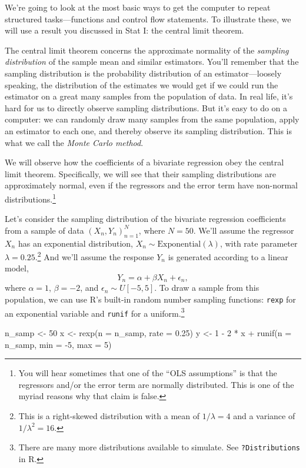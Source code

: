 \documentclass[
  12pt,
  oneside,openany]{book}
\newenvironment{Shaded}{\begin{snugshade}}{\end{snugshade}}
\newcommand{\AttributeTok}[1]{\textcolor[rgb]{0.77,0.63,0.00}{#1}}
\newcommand{\DecValTok}[1]{\textcolor[rgb]{0.00,0.00,0.81}{#1}}
\newcommand{\FloatTok}[1]{\textcolor[rgb]{0.00,0.00,0.81}{#1}}
\newcommand{\FunctionTok}[1]{\textcolor[rgb]{0.00,0.00,0.00}{#1}}
\newcommand{\NormalTok}[1]{#1}
\newcommand{\OtherTok}[1]{\textcolor[rgb]{0.56,0.35,0.01}{#1}}
\newcommand{\SpecialCharTok}[1]{\textcolor[rgb]{0.00,0.00,0.00}{#1}}
\begin{document}
We're going to look at the most basic ways to get the computer to repeat structured tasks---functions and control flow statements. To illustrate these, we will use a result you discussed in Stat I: the central limit theorem.

The central limit theorem concerns the approximate normality of the \emph{sampling distribution} of the sample mean and similar estimators.
You'll remember that the sampling distribution is the probability distribution of an estimator---loosely speaking, the distribution of the estimates we would get if we could run the estimator on a great many samples from the population of data.
In real life, it's hard for us to directly observe sampling distributions.
But it's easy to do on a computer: we can randomly draw many samples from the same population, apply an estimator to each one, and thereby observe its sampling distribution.
This is what we call the \emph{Monte Carlo method}.

We will observe how the coefficients of a bivariate regression obey the central limit theorem.
Specifically, we will see that their sampling distributions are approximately normal, even if the regressors and the error term have non-normal distributions.\footnote{You will hear sometimes that one of the ``OLS assumptions'' is that the regressors and/or the error term are normally distributed. This is one of the myriad reasons why that claim is false.}

Let's consider the sampling distribution of the bivariate regression coefficients from a sample of data \((X_n, Y_n)_{n=1}^N\), where \(N = 50\).
We'll assume the regressor \(X_n\) has an exponential distribution, \(X_n \sim \text{Exponential}(\lambda)\), with rate parameter \(\lambda = 0.25\).\footnote{This is a right-skewed distribution with a mean of \(1 / \lambda = 4\) and a variance of \(1 / \lambda^2 = 16\).}
And we'll assume the response \(Y_n\) is generated according to a linear model, \[Y_n = \alpha + \beta X_n + \epsilon_n,\] where \(\alpha = 1\), \(\beta = -2\), and \(\epsilon_n \sim U[-5, 5]\).
To draw a sample from this population, we can use R's built-in random number sampling functions: \texttt{rexp} for an exponential variable and \texttt{runif} for a uniform.\footnote{There are many more distributions available to simulate. See \texttt{?Distributions} in R.}

\begin{Shaded}
\begin{Highlighting}[]
\NormalTok{n\_samp }\OtherTok{\textless{}{-}} \DecValTok{50}
\NormalTok{x }\OtherTok{\textless{}{-}} \FunctionTok{rexp}\NormalTok{(}\AttributeTok{n =}\NormalTok{ n\_samp, }\AttributeTok{rate =} \FloatTok{0.25}\NormalTok{)}
\NormalTok{y }\OtherTok{\textless{}{-}} \DecValTok{1} \SpecialCharTok{{-}} \DecValTok{2} \SpecialCharTok{*}\NormalTok{ x }\SpecialCharTok{+} \FunctionTok{runif}\NormalTok{(}\AttributeTok{n =}\NormalTok{ n\_samp, }\AttributeTok{min =} \SpecialCharTok{{-}}\DecValTok{5}\NormalTok{, }\AttributeTok{max =} \DecValTok{5}\NormalTok{)}
\end{Highlighting}
\end{Shaded}
\end{document}
